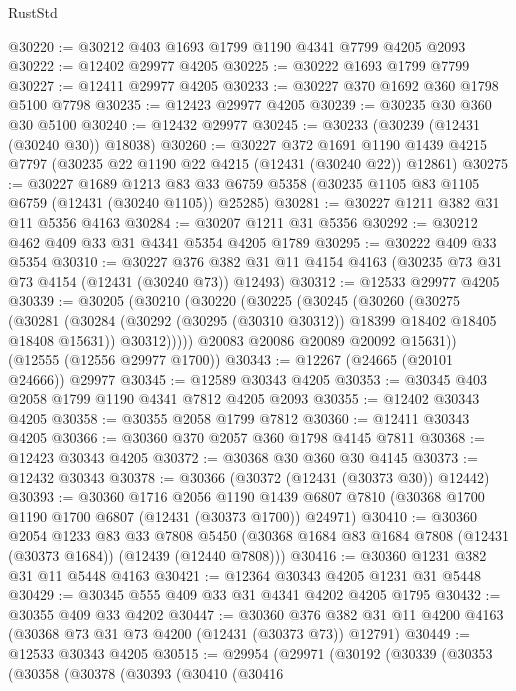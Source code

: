 \begin{lexlean}{RustStd}
\begin{coremodule}
@30220 := @30212 @403 @1693 @1799 @1190 @4341 @7799 @4205 @2093
@30222 := @12402 @29977 @4205
@30225 := @30222 @1693 @1799 @7799
@30227 := @12411 @29977 @4205
@30233 := @30227 @370 @1692 @360 @1798 @5100 @7798
@30235 := @12423 @29977 @4205
@30239 := @30235 @30 @360 @30 @5100
@30240 := @12432 @29977
@30245 := @30233 (@30239 (@12431 (@30240 @30)) @18038)
@30260 := @30227
    @372
    @1691
    @1190
    @1439
    @4215
    @7797
    (@30235 @22 @1190 @22 @4215 (@12431 (@30240 @22)) @12861)
@30275 := @30227
    @1689
    @1213
    @83
    @33
    @6759
    @5358
    (@30235 @1105 @83 @1105 @6759 (@12431 (@30240 @1105)) @25285)
@30281 := @30227 @1211 @382 @31 @11 @5356 @4163
@30284 := @30207 @1211 @31 @5356
@30292 := @30212 @462 @409 @33 @31 @4341 @5354 @4205 @1789
@30295 := @30222 @409 @33 @5354
@30310 := @30227
    @376
    @382
    @31
    @11
    @4154
    @4163
    (@30235 @73 @31 @73 @4154 (@12431 (@30240 @73)) @12493)
@30312 := @12533 @29977 @4205
@30339 := @30205
    (@30210
      (@30220
        (@30225
          (@30245
            (@30260
              (@30275
                (@30281
                  (@30284 (@30292 (@30295 (@30310 @30312)) @18399 @18402 @18405 @18408 @15631))
                  @30312)))))
        @20083
        @20086
        @20089
        @20092
        @15631))
    (@12555 (@12556 @29977 @1700))
@30343 := @12267 (@24665 (@20101 @24666)) @29977
@30345 := @12589 @30343 @4205
@30353 := @30345 @403 @2058 @1799 @1190 @4341 @7812 @4205 @2093
@30355 := @12402 @30343 @4205
@30358 := @30355 @2058 @1799 @7812
@30360 := @12411 @30343 @4205
@30366 := @30360 @370 @2057 @360 @1798 @4145 @7811
@30368 := @12423 @30343 @4205
@30372 := @30368 @30 @360 @30 @4145
@30373 := @12432 @30343
@30378 := @30366 (@30372 (@12431 (@30373 @30)) @12442)
@30393 := @30360
    @1716
    @2056
    @1190
    @1439
    @6807
    @7810
    (@30368 @1700 @1190 @1700 @6807 (@12431 (@30373 @1700)) @24971)
@30410 := @30360
    @2054
    @1233
    @83
    @33
    @7808
    @5450
    (@30368 @1684 @83 @1684 @7808 (@12431 (@30373 @1684)) (@12439 (@12440 @7808)))
@30416 := @30360 @1231 @382 @31 @11 @5448 @4163
@30421 := @12364 @30343 @4205 @1231 @31 @5448
@30429 := @30345 @555 @409 @33 @31 @4341 @4202 @4205 @1795
@30432 := @30355 @409 @33 @4202
@30447 := @30360
    @376
    @382
    @31
    @11
    @4200
    @4163
    (@30368 @73 @31 @73 @4200 (@12431 (@30373 @73)) @12791)
@30449 := @12533 @30343 @4205
@30515 := @29954
    (@29971
      (@30192
        (@30339
          (@30353
            (@30358
              (@30378
                (@30393
                  (@30410
                    (@30416

\end{coremodule}
\end{lexlean}
